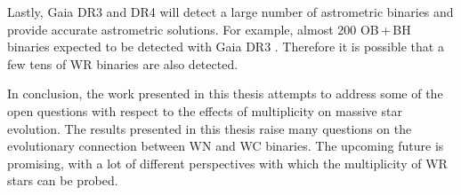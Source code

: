 Lastly, Gaia DR3 and DR4 will detect a large number of astrometric binaries and provide accurate astrometric solutions. For example, almost 200 OB\,+\,BH binaries expected to be detected with Gaia DR3 \citep{2022Janssens}. Therefore it is possible that a few tens of WR binaries are also detected. 

In conclusion, the work presented in this thesis attempts to address some of the open questions with respect to the effects of multiplicity on massive star evolution. The results presented in this thesis raise many questions on the evolutionary connection between WN and WC binaries. The upcoming future is promising, with a lot of different perspectives with which the multiplicity of WR stars can be probed. 


